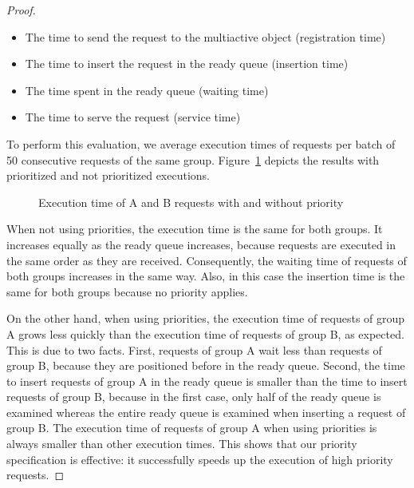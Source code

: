 \documentclass[11pt]{report}
\begin{document}
\begin{proof}
\begin{itemize}
\item The time to send the request to the multiactive object (registration time)
\item The time to insert the request in the ready queue (insertion time)
\item The time spent in the ready queue (waiting time)
\item The time to serve the request (service time)
\end{itemize}

To perform this evaluation, we average execution times of requests per batch of 50 consecutive requests of the same group. Figure~\ref{fig:effectivity} depicts the results with prioritized and not prioritized executions.
\begin{figure}[!ht]
      \caption{Execution time of A and B requests with and without priority}
      \label{fig:effectivity} 
\end{figure}
When not using priorities, the execution time is the same for both groups. It increases equally as the ready queue increases, because requests are executed in the same order as they are received. Consequently, the waiting time of requests of both groups increases in the same way. Also, in this case the insertion time is the same for both groups because no priority applies.

On the other hand, when using priorities, the execution time of requests of group A grows less quickly than the execution time of requests of group B, as expected. This is due to two facts. First, requests of group A wait less than requests of group B, because they are positioned before in the ready queue. Second, the time to insert requests of group A in the ready queue is smaller than the time to insert requests of group B, because in the first case, only half of the ready queue is examined whereas the entire ready queue is examined when inserting a request of group B. The execution time of requests of group A when using priorities is always smaller than other execution times. This shows that our priority specification is effective: it successfully speeds up the execution of high priority requests. 


\end{proof}
\end{document}
